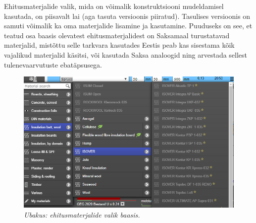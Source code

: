 Ehitusmaterjalide valik, mida on võimalik konstruktsiooni mudeldamisel kasutada, on piisavalt lai 
(aga tasuta versioonis piiratud). Tasulises versioonis on samuti võimalik ka oma materjalide 
lisamine ja kasutamine. Puuduseks on see, et teatud osa baasis olevatest ehitusmaterjalidest on Saksamaal
turustatavad materjalid, mistõttu selle tarkvara kasutades Eestis peab kas sisestama kõik vajalikud 
materjalid käsitsi, või kasutada Saksa analoogid ning arvestada sellest tulenevaarvutuste ebatäpsusega.
\begin{figure}[ht]
    \centering
    \includegraphics[width=.6\textwidth]{figures/problem_statement/03_ubakus_materials.png}
    \caption{\textit{Ubakus: ehitusmaterjalide valik baasis.}}
    \label{fig:ubakus_materials}
\end{figure}
